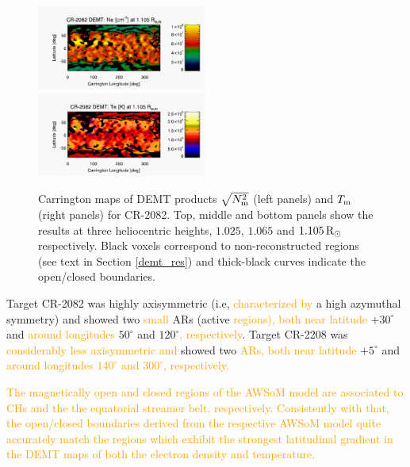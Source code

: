 \documentclass[namedreferences]{solarphysics}
\newcommand{\mdeg}{^\circ}
\newcommand{\mrsun}{{\rm R_\odot}}
\newcommand{\Tm}{T_{\rm m}}
\newcommand{\Nsqm}{N^2_{{\rm m}}}
\newcommand{\sqravgN}{\sqrt{\Nsqm}}
\def\albert#1{\textcolor{orange}{#1}}
\begin{document}
\begin{article}
\begin{figure}[h!]
\begin{center}
\includegraphics[width=0.495\textwidth]{figs/map_Ne_CR2082_DEMT-EUVI_behind_H1-L3523_r3d_1105_Rsun.pdf}
\includegraphics[width=0.495\textwidth]{figs/map_Tm_CR2082_DEMT-EUVI_behind_H1-L3523_r3d_1105_Rsun.pdf}
\caption{Carrington maps of DEMT {products $\sqravgN$} (left panels) and $\Tm$ (right panels) for CR-2082. Top, middle and bottom panels show the results at three heliocentric heights, $1.025$, $1.065$ and $1.105\,\mrsun$ respectively. Black voxels correspond to non-reconstructed regions (see text in Section \ref{demt_res}) and thick-black curves indicate the open/closed boundaries.}
\label{carmaps_demt_2082}
\end{center}
\end{figure}

Target CR-2082 was highly axisymmetric (i.e, \albert{characterized by} a high azymuthal symmetry) and showed two \albert{small} ARs (active \albert{regions), both near latitude} $+30\mdeg$ and \albert{around longitudes} $50\mdeg$ and $120\mdeg$\albert{, respectively}. Target CR-2208 was \albert{considerably less axisymmetric and} showed two \albert{ARs, both near latitude} $+5\mdeg$ and \albert{around longitudes $140\mdeg$ and $300\mdeg$, respectively.} 

\albert{The magnetically open and closed regions of the AWSoM model are associated to CHs and the the equatorial streamer belt, respectively. Consistently with that, the open/closed boundaries derived from the respective AWSoM model quite accurately match the regions which exhibit the strongest latitudinal gradient in the DEMT maps of both the electron density and temperature.}


\end{article}
\end{document}

